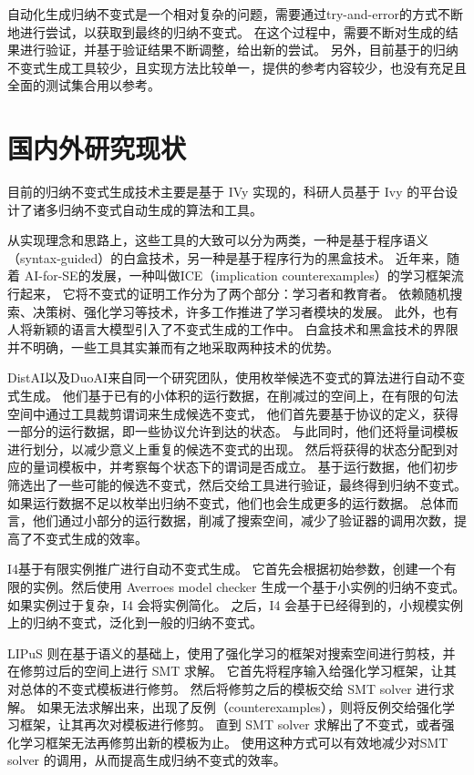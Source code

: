 自动化生成归纳不变式是一个相对复杂的问题，需要通过try-and-error的方式不断地进行尝试，以获取到最终的归纳不变式。
在这个过程中，需要不断对生成的结果进行验证，并基于验证结果不断调整，给出新的尝试。
另外，目前基于\TLA 的归纳不变式生成工具较少，且实现方法比较单一，提供的参考内容较少，也没有充足且全面的测试集合用以参考。

\section{国内外研究现状}
目前的归纳不变式生成技术主要是基于 IVy 实现的，科研人员基于 Ivy 的平台设计了诸多归纳不变式自动生成的算法和工具。

从实现理念和思路上，这些工具的大致可以分为两类，一种是基于程序语义（syntax-guided）\cite{syntax}的白盒技术，另一种是基于程序行为的黑盒技术。
近年来，随着 AI-for-SE的发展，一种叫做ICE\cite{ICE}（implication counterexamples）\cite{safe}的学习框架流行起来，
它将不变式的证明工作分为了两个部分：学习者和教育者。
依赖随机搜索、决策树\cite{garg2016learning}、强化学习\cite{LIPuS}等技术，许多工作推进了学习者模块的发展。
此外，也有人将新颖的语言大模型引入了不变式生成的工作中\cite{llm}。
白盒技术和黑盒技术的界限并不明确，一些工具其实兼而有之地采取两种技术的优势。

DistAI\cite{DistAI}以及DuoAI\cite{DuoAI}来自同一个研究团队，使用枚举候选不变式的算法进行自动不变式生成。
他们基于已有的小体积的运行数据，在削减过的空间上，在有限的句法空间中通过工具裁剪谓词来生成候选不变式，
他们首先要基于协议的定义，获得一部分的运行数据，即一些协议允许到达的状态。
与此同时，他们还将量词模板进行划分，以减少意义上重复的候选不变式的出现。
然后将获得的状态分配到对应的量词模板中，并考察每个状态下的谓词是否成立。
基于运行数据，他们初步筛选出了一些可能的候选不变式，然后交给工具进行验证，最终得到归纳不变式。
如果运行数据不足以枚举出归纳不变式，他们也会生成更多的运行数据。
总体而言，他们通过小部分的运行数据，削减了搜索空间，减少了验证器的调用次数，提高了不变式生成的效率。

I4\cite{I4}基于有限实例推广进行自动不变式生成。
它首先会根据初始参数，创建一个有限的实例。然后使用 Averroes model checker \cite{goel2019model}生成一个基于小实例的归纳不变式。
如果实例过于复杂，I4 会将实例简化。
之后，I4 会基于已经得到的，小规模实例上的归纳不变式，泛化到一般的归纳不变式。

LIPuS 则在基于语义的基础上，使用了强化学习的框架对搜索空间进行剪枝，并在修剪过后的空间上进行 SMT 求解。
它首先将程序输入给强化学习框架，让其对总体的不变式模板进行修剪。
然后将修剪之后的模板交给 SMT solver 进行求解。
如果无法求解出来，出现了反例（counterexamples），则将反例交给强化学习框架，让其再次对模板进行修剪。
直到 SMT solver 求解出了不变式，或者强化学习框架无法再修剪出新的模板为止。
使用这种方式可以有效地减少对SMT solver 的调用，从而提高生成归纳不变式的效率。

